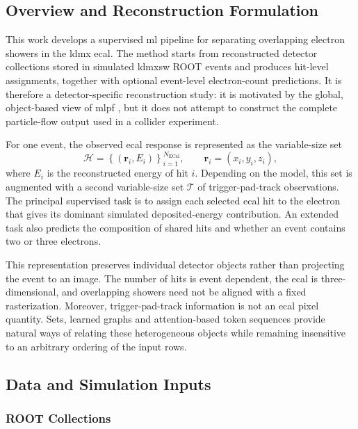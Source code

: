 \subsection{Overview and Reconstruction Formulation}
\label{sec:method_overview}

This work develops a supervised \gls{ml} pipeline for separating overlapping
electron showers in the \gls{ldmx} \gls{ecal}. The method starts from
reconstructed detector collections stored in simulated \gls{ldmxsw} ROOT
events and produces hit-level assignments, together with optional
event-level electron-count predictions. It is therefore a detector-specific
reconstruction study: it is motivated by the global, object-based view of
\gls{mlpf} \cite{pata2021-mlpf,pata2026-mlpf}, but it does not attempt to
construct the complete particle-flow output used in a collider experiment.

For one event, the observed \gls{ecal} response is represented as the
variable-size set
\begin{equation}
    \mathcal{H} =
    \left\{
    \left(\boldsymbol{r}_i,E_i\right)
    \right\}_{i=1}^{N_{\mathrm{ECal}}},
    \qquad
    \boldsymbol{r}_i=(x_i,y_i,z_i),
\end{equation}
where \(E_i\) is the reconstructed energy of hit \(i\). Depending on the
model, this set is augmented with a second variable-size set
\(\mathcal{T}\) of trigger-pad-track observations. The principal supervised
task is to assign each selected \gls{ecal} hit to the electron that gives its
dominant simulated deposited-energy contribution. An extended task also
predicts the composition of shared hits and whether an event contains two or
three electrons.

This representation preserves individual detector objects rather than
projecting the event to an image. The number of hits is event dependent, the
\gls{ecal} is three-dimensional, and overlapping showers need not be aligned
with a fixed rasterization. Moreover, trigger-pad-track information is not an
\gls{ecal} pixel quantity. Sets, learned graphs and attention-based token
sequences provide natural ways of relating these heterogeneous objects while
remaining insensitive to an arbitrary ordering of the input rows.

\subsection{Data and Simulation Inputs}
\label{sec:method_data}

\subsubsection{ROOT Collections}

